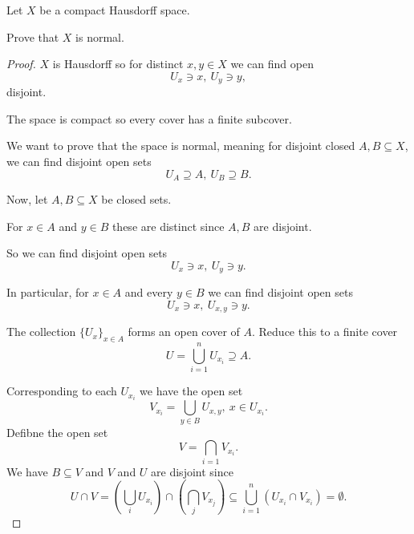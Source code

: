\documentclass[11pt]{article}
\begin{document}
\begin{prob}
    Let $X$ be a compact Hausdorff space. 

    Prove that $X$ is normal. 
\end{prob}
\begin{proof}
    $X$ is Hausdorff so for distinct 
    $x,y \in X$ we can find 
    open 
    \[
        U_x \ni x, \ U_y \ni y, 
    \]
    disjoint. 

    The space is compact so every cover has a 
    finite subcover. 

    We want to prove that the space is normal, meaning 
    for disjoint closed $A,B \subseteq X$, 
    we can find disjoint open sets 
    \[
        U_A \supseteq A, \ U_B \supseteq B. 
    \]
    
    Now, let $A,B \subseteq X$ be closed sets. 

    For $x \in A$ and $y \in B$ these are 
    distinct since $A,B$ are disjoint. 

    So we can find disjoint open sets 
    \[
        U_x \ni x, \ U_y \ni y. 
    \]

    In particular, for $x \in A$ and every $y \in B$ we 
    can find disjoint open sets 
    \[
        U_x \ni x, \ U_{x,y} \ni y. 
    \]

    The collection $\{U_x\}_{x\in A}$ forms an 
    open cover of $A$. 
    Reduce this to a finite cover 
    \[
        U = \bigcup_{i=1}^n U_{x_i} \supseteq A. 
    \]

    Corresponding to each $U_{x_i}$ we have 
    the open set 
    \[
        V_{x_i} = \bigcup_{y\in B} U_{x,y}, \ x \in U_{x_i}.   
    \]
    Defibne the open set 
    \[
        V = \bigcap_{i=1} V_{x_i}. 
    \]
    We have $B \subseteq V$ and 
    $V$ and $U$ are disjoint since 
    \[
        U \cap V = \left(\bigcup_i U_{x_i}\right) 
        \cap \left(\bigcap_j V_{x_j}\right) 
        \subseteq \bigcup_{i=1}^n (U_{x_i} \cap V_{x_i}) 
        = \emptyset. 
    \]
\end{proof}
\end{document}
